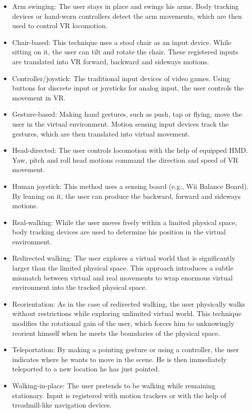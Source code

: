 \begin{itemize}
\item Arm swinging: The user stays in place and swings his arms. Body tracking devices or hand-worn controllers detect the arm movements, which are then used to control VR locomotion.
\item Chair-based: This technique uses a stool chair as an input device. While sitting on it, the user can tilt and rotate the chair. These registered inputs are translated into VR forward, backward and sideways motions.
\item Controller/joystick: The traditional input devices of video games. Using buttons for discrete input or joysticks for analog input, the user controls the movement in VR.
\item Gesture-based: Making hand gestures, such as push, tap or flying, move the user in the virtual environment. Motion sensing input devices track the gestures, which are then translated into virtual movement.
\item Head-directed: The user controls locomotion with the help of equipped HMD. Yaw, pitch and roll head motions command the direction and speed of VR movement.
\item Human joystick: This method uses a sensing board (e.g., Wii Balance Board). By leaning on it, the user can produce the backward, forward and sideways motions.
\item Real-walking: While the user moves freely within a limited physical space, body tracking devices are used to determine his position in the virtual environment.
\item Redirected walking: The user explores a virtual world that is significantly larger than the limited physical space. This approach introduces a subtle mismatch between virtual and real movements to wrap enormous virtual environment into the tracked physical space.
\item Reorientation: As in the case of redirected walking, the user physically walks without restrictions while exploring unlimited virtual world. This technique modifies the rotational gain of the user, which forces him to unknowingly reorient himself when he meets the boundaries of the physical space.
\item Teleportation: By making a pointing gesture or using a controller, the user indicates where he wants to move in the scene. He is then immediately teleported to a new location he has just pointed.
\item Walking-in-place: The user pretends to be walking while remaining stationary. Input is registered with motion trackers or with the help of treadmill-like navigation devices.
\end{itemize}

